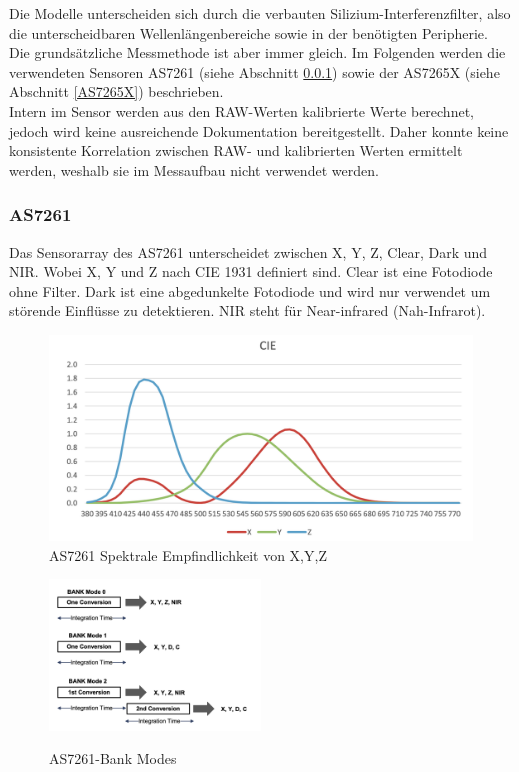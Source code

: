 \noindent Die Modelle unterscheiden sich durch die verbauten Silizium-Interferenzfilter, also die unterscheidbaren Wellenlängenbereiche sowie in der benötigten Peripherie.
Die grundsätzliche Messmethode ist aber immer gleich.
Im Folgenden werden die verwendeten Sensoren AS7261 (siehe Abschnitt \ref{AS7261}) sowie der AS7265X (siehe Abschnitt \ref{AS7265X}) beschrieben.\\
Intern im Sensor werden aus den RAW-Werten kalibrierte Werte berechnet, jedoch wird keine ausreichende Dokumentation bereitgestellt.
Daher konnte keine konsistente Korrelation zwischen RAW- und kalibrierten Werten ermittelt werden, weshalb sie im Messaufbau nicht verwendet werden.


\newpage
\subsubsection{AS7261}\label{AS7261}
Das Sensorarray des AS7261 unterscheidet zwischen X, Y, Z, Clear, Dark und NIR.
Wobei X, Y und Z nach CIE 1931 definiert sind.
Clear ist eine Fotodiode ohne Filter.
Dark ist eine abgedunkelte Fotodiode und wird nur verwendet um störende Einflüsse zu detektieren.
NIR steht für Near-infrared  (Nah-Infrarot).\\

\begin{figure}[H]
  \centering
 \includegraphics[width=0.6\linewidth]{img/AS7261-Spectral_Responsivity.png}
  \caption{AS7261 Spektrale Empfindlichkeit von X,Y,Z \cite{Datenblatt_AS7261}}
  \label{fig:AS7261-Spectral_Responsivity}
\end{figure}


\begin{figure}
\centering
\includegraphics[width=0.5\textwidth]{img/AS7261-Bank_Modes.png}
\label{fig:AS7261-Bank_Modes}
\caption{AS7261-Bank Modes \cite{Datenblatt_AS7261}}
\end{figure}

